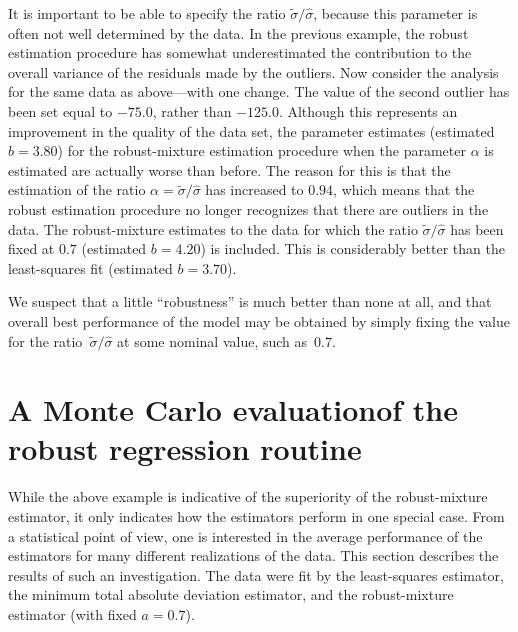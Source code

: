\documentclass{admbmanual}
\begin{document}
It is important to be able to specify the ratio $\tilde\sigma/\hat\sigma$,
because this parameter is often not well determined by the 
data. In the previous example, the robust estimation
procedure has somewhat underestimated the contribution to the overall
variance of the residuals made by the outliers. Now 
consider the analysis for the same data as above---with one change.
The value of
the second outlier has been set equal to $-75.0$, rather than $-125.0$.
Although this represents an improvement in the
quality of the data set, the parameter estimates (estimated $b=3.80$)
for the robust-mixture estimation
procedure when the parameter $\alpha$ is estimated are 
actually worse than before. The reason for this is
that the estimation of the ratio $\alpha=\tilde\sigma/\hat\sigma$ has
increased to $0.94$, which means that the robust estimation procedure
no longer recognizes that there are outliers in the data.  
The robust-mixture estimates to the data for which the 
ratio $\tilde\sigma/\hat\sigma$
has been fixed at $0.7$ (estimated $b=4.20$) is included. 
This  is considerably better than the least-squares fit (estimated $b=3.70$).

\begin{figure}
  \centering\hskip1pt
   
   \emptycaption{}
   \label{fig:robust-nonlinear-regression-02}  %
\end{figure}


We suspect that a little ``robustness'' is much better 
than none at all, and that overall best performance of the 
model may be obtained by simply fixing the value for
 the ratio~$\tilde\sigma/\hat\sigma$ at some nominal value,
such as~$0.7$.
 

\section{A Monte Carlo evaluation\br of the robust regression routine}
\label{sec:monte-carlo}

While the above example is indicative of the superiority of the
robust-mixture estimator, it only indicates how the
estimators perform in one special case. From a statistical point of
view, one is interested in the average performance of
the estimators for many different realizations of the data.
This section describes the results of such an investigation.
The data were fit by the least-squares estimator, the minimum total
absolute deviation estimator, and the robust-mixture estimator
(with fixed $a=0.7$). 
\end{document}
